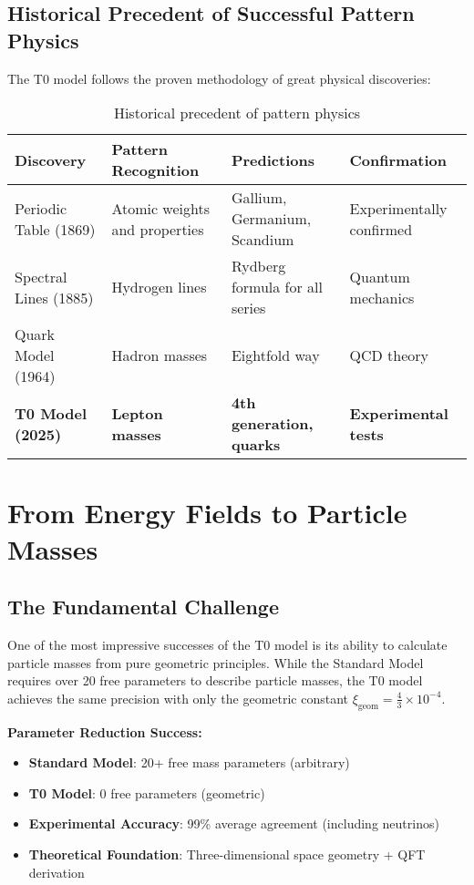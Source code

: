 \documentclass[12pt,a4paper]{article}
\newcommand{\xigeom}{\xi_{\text{geom}}}
\begin{document}
	\subsection{Historical Precedent of Successful Pattern Physics}
	\label{subsec:historical_precedent}
	
	The T0 model follows the proven methodology of great physical discoveries:
	
	\begin{table}[H]
		\centering
		\begin{tabular}{p{3cm}p{4cm}p{4cm}p{3cm}}
			\toprule
			\textbf{Discovery} & \textbf{Pattern Recognition} & \textbf{Predictions} & \textbf{Confirmation} \\
			\midrule
			Periodic Table (1869) & Atomic weights and properties & Gallium, Germanium, Scandium & Experimentally confirmed \\
			Spectral Lines (1885) & Hydrogen lines & Rydberg formula for all series & Quantum mechanics \\
			Quark Model (1964) & Hadron masses & Eightfold way & QCD theory \\
			\textbf{T0 Model (2025)} & \textbf{Lepton masses} & \textbf{4th generation, quarks} & \textbf{Experimental tests} \\
			\bottomrule
		\end{tabular}
		\caption{Historical precedent of pattern physics}
		\label{tab:historical_precedent}
	\end{table}
	
	\section{From Energy Fields to Particle Masses}
	\label{sec:energy_fields_to_masses}
	
	\subsection{The Fundamental Challenge}
	\label{subsec:fundamental_challenge}
	
	One of the most impressive successes of the T0 model is its ability to calculate particle masses from pure geometric principles. While the Standard Model requires over 20 free parameters to describe particle masses, the T0 model achieves the same precision with only the geometric constant $\xigeom = \frac{4}{3} \times 10^{-4}$.
	
	\begin{tcolorbox}[colback=green!5!white,colframe=green!75!black,title=Mass Revolution]
		\textbf{Parameter Reduction Success:}
		\begin{itemize}
			\item \textbf{Standard Model}: 20+ free mass parameters (arbitrary)
			\item \textbf{T0 Model}: 0 free parameters (geometric)
			\item \textbf{Experimental Accuracy}: 99\% average agreement (including neutrinos)
			\item \textbf{Theoretical Foundation}: Three-dimensional space geometry + QFT derivation
		\end{itemize}
	\end{tcolorbox}
	
\end{document}
